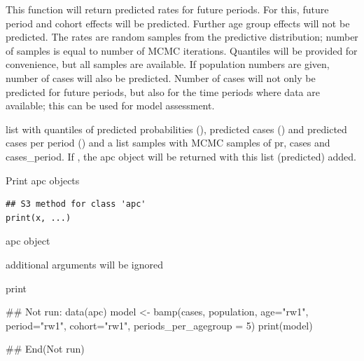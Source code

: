 \documentclass[a4paper]{book}
\begin{document}
%
\begin{Details}
This function will return predicted rates for future periods. For this, future period and cohort effects will be predicted.
Further age group effects will not be predicted. The rates are random samples from the predictive distribution; number of samples is equal
to number of MCMC iterations. Quantiles will be provided for convenience, but all samples are available.
If population numbers are given, number of cases will also be predicted. Number of cases 
will not only be predicted for future periods,
but also for the time periods where data are available; this can be used for model assessment.
\end{Details}
%
\begin{Value}
list with quantiles of predicted probabilities (), predicted cases () and predicted cases per period ()
and a list samples with MCMC samples of pr, cases and cases\_period. 
If , the apc object will be returned with this list (predicted) added.
\end{Value}
%
\begin{SeeAlso}
\end{SeeAlso}
%
\begin{Examples}
\end{Examples}
%
\begin{Description}
Print apc objects
\end{Description}
%
\begin{Usage}
\begin{verbatim}
## S3 method for class 'apc'
print(x, ...)
\end{verbatim}
\end{Usage}
%
\begin{Arguments}
\begin{ldescription}
\item[\code{x}] apc object

\item[\code{...}] additional arguments will be ignored
\end{ldescription}
\end{Arguments}
%
\begin{Value}
print
\end{Value}
%
\begin{Examples}
\begin{ExampleCode}
## Not run: 
data(apc)
model <- bamp(cases, population, age="rw1", period="rw1", cohort="rw1", periods_per_agegroup = 5)
print(model)

## End(Not run)
\end{ExampleCode}
\end{Examples}
\printindex{}
\end{document}
